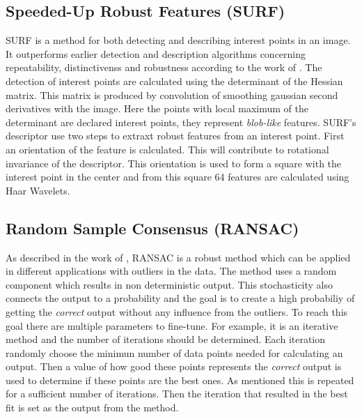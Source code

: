 \subsection{Speeded-Up Robust Features (SURF)}
SURF is a method for both detecting and describing interest points in an image. It outperforms earlier detection and description algorithms concerning repeatability, distinctivenss and robustness according to the work of \cite{SURF}. The detection of interest points are calculated using the determinant of the Hessian matrix. This matrix is produced by convolution of smoothing gaussian second derivatives with the image. Here the points with local maximum of the determinant are declared interest points, they represent {\it blob-like} features. SURF's descriptor use two steps to extraxt robust features from an interest point. First an orientation of the feature is calculated. This will contribute to rotational invariance of the descriptor. This orientation is used to form a square with the interest point in the center and from this square 64 features are calculated using Haar Wavelets.

\subsection{Random Sample Consensus (RANSAC)}
As described in the work of \cite{RANSAC}, RANSAC is a robust method which can be applied in different applications with outliers in the data. 
The method uses a random component which results in non deterministic output. This stochasticity also connects the output to a probability and the goal is to create a high probabiliy of getting the {\it correct} output without any influence from the outliers. 
To reach this goal there are multiple parameters to fine-tune. For example, it is an iterative method and the number of iterations should be determined. Each iteration randomly choose the minimun number of data points needed for calculating an output. 
Then a value of how good these points represents the {\it correct} output is used to determine if these points are the best ones. 
As mentioned this is repeated for a sufficient number of iterations. Then the iteration that resulted in the best fit is set as the output from the method.
